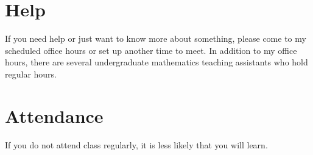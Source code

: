 \documentclass[12pt]{article}
\begin{document}
\section*{Help}
If you need help or just want to know more about something, please come to my scheduled office hours or set up another time to meet. 
In addition to my office hours, there are several undergraduate mathematics teaching assistants who hold regular hours.

\section*{Attendance}
If you do not attend class regularly, it is less likely that you will learn.
\end{document}
